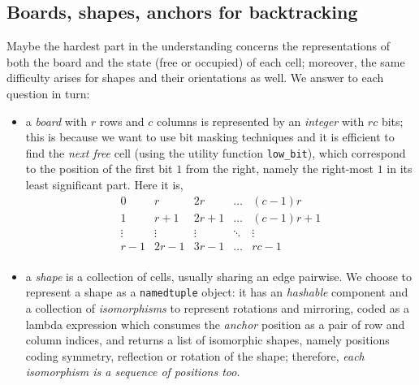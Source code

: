 \subsection{Boards, shapes, anchors for backtracking}

Maybe the hardest part in the understanding concerns the representations of
both the board and the state (free or occupied) of each cell; moreover, the
same difficulty arises for shapes and their orientations as well. We answer to
each question in turn:
\begin{itemize}
    \item a \textit{board} with $r$ rows and $c$ columns is represented by an
    \textit{integer} with $rc$ bits; this is because we want to use bit masking
    techniques and it is efficient to find the \textit{next free} cell (using
    the utility function \verb|low_bit|), which correspond to the position of
    the first bit $1$ from the right, namely the right-most $1$ in its least
    significant part. Here it is,
    \begin{displaymath}
    \begin{array}{c|c|c|c|c}
    0 & r & 2r & \ldots & (c-1)r \\
    \hline
    1 & r+1 & 2r+1 & \ldots & (c-1)r+1 \\
    \hline
    \vdots & \vdots & \vdots & \ddots & \vdots \\
    \hline
    r-1 & 2r-1 & 3r-1 & \ldots & rc-1\\
    \end{array}
    \end{displaymath}

    \item a \textit{shape} is a collection of cells, usually sharing an edge
    pairwise. We choose to represent a shape as a \verb|namedtuple| object: it
    has an \textit{hashable} component and a collection of
    \textit{isomorphisms} to represent rotations and mirroring, coded as a
    lambda expression which consumes the \textit{anchor} position as a pair of row
    and column indices, and returns a list of isomorphic shapes, namely
    positions coding symmetry, reflection or rotation of the shape; therefore,
    \textit{each isomorphism is a sequence of positions too}.


\end{itemize}
